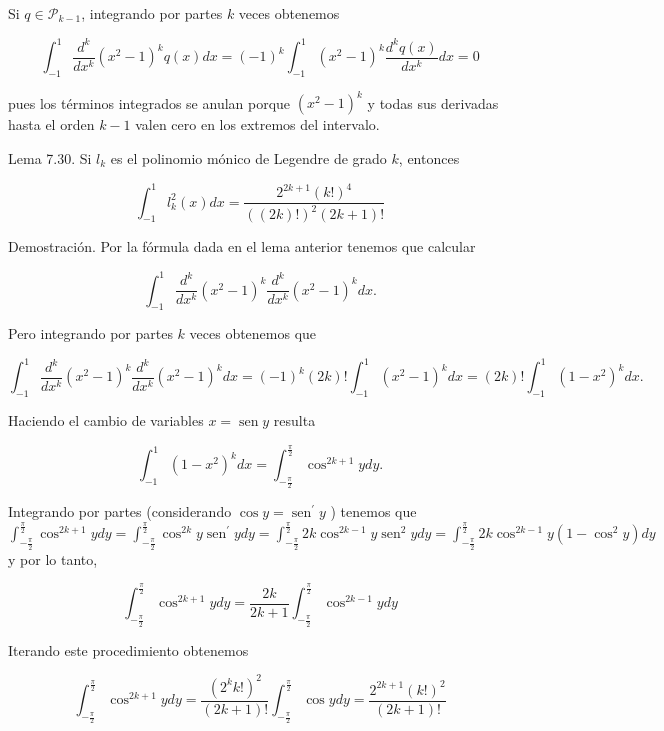 \documentclass[10pt]{book}
\begin{document}
Si $q \in \mathcal{P}_{k-1}$, integrando por partes $k$ veces obtenemos

$$
\int_{-1}^{1} \frac{d^{k}}{d x^{k}}\left(x^{2}-1\right)^{k} q(x) d x=(-1)^{k} \int_{-1}^{1}\left(x^{2}-1\right)^{k} \frac{d^{k} q(x)}{d x^{k}} d x=0
$$

pues los términos integrados se anulan porque $\left(x^{2}-1\right)^{k}$ y todas sus derivadas hasta el orden $k-1$ valen cero en los extremos del intervalo.

Lema 7.30. Si $l_{k}$ es el polinomio mónico de Legendre de grado $k$, entonces

$$
\int_{-1}^{1} l_{k}^{2}(x) d x=\frac{2^{2 k+1}(k!)^{4}}{((2 k)!)^{2}(2 k+1)!}
$$

Demostración. Por la fórmula dada en el lema anterior tenemos que calcular

$$
\int_{-1}^{1} \frac{d^{k}}{d x^{k}}\left(x^{2}-1\right)^{k} \frac{d^{k}}{d x^{k}}\left(x^{2}-1\right)^{k} d x .
$$

Pero integrando por partes $k$ veces obtenemos que

$$
\int_{-1}^{1} \frac{d^{k}}{d x^{k}}\left(x^{2}-1\right)^{k} \frac{d^{k}}{d x^{k}}\left(x^{2}-1\right)^{k} d x=(-1)^{k}(2 k)!\int_{-1}^{1}\left(x^{2}-1\right)^{k} d x=(2 k)!\int_{-1}^{1}\left(1-x^{2}\right)^{k} d x .
$$

Haciendo el cambio de variables $x=\operatorname{sen} y$ resulta

$$
\int_{-1}^{1}\left(1-x^{2}\right)^{k} d x=\int_{-\frac{\pi}{2}}^{\frac{\pi}{2}} \cos ^{2 k+1} y d y .
$$

Integrando por partes (considerando $\cos y=\operatorname{sen}^{\prime} y$ ) tenemos que\\
$\int_{-\frac{\pi}{2}}^{\frac{\pi}{2}} \cos ^{2 k+1} y d y=\int_{-\frac{\pi}{2}}^{\frac{\pi}{2}} \cos ^{2 k} y \operatorname{sen}^{\prime} y d y=\int_{-\frac{\pi}{2}}^{\frac{\pi}{2}} 2 k \cos ^{2 k-1} y \operatorname{sen}^{2} y d y=\int_{-\frac{\pi}{2}}^{\frac{\pi}{2}} 2 k \cos ^{2 k-1} y\left(1-\cos ^{2} y\right) d y$\\
y por lo tanto,

$$
\int_{-\frac{\pi}{2}}^{\frac{\pi}{2}} \cos ^{2 k+1} y d y=\frac{2 k}{2 k+1} \int_{-\frac{\pi}{2}}^{\frac{\pi}{2}} \cos ^{2 k-1} y d y
$$

Iterando este procedimiento obtenemos

$$
\int_{-\frac{\pi}{2}}^{\frac{\pi}{2}} \cos ^{2 k+1} y d y=\frac{\left(2^{k} k!\right)^{2}}{(2 k+1)!} \int_{-\frac{\pi}{2}}^{\frac{\pi}{2}} \cos y d y=\frac{2^{2 k+1}(k!)^{2}}{(2 k+1)!}
$$
\end{document}
